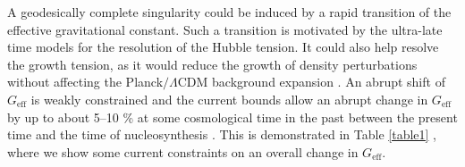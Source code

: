 \documentclass[universe,article,accept,moreauthors,pdftex]{Definitions/mdpi}
\begin{document}
A geodesically complete singularity could be induced by a rapid transition of the effective gravitational constant. Such a transition is motivated by the ultra-late time models for the resolution of
the Hubble tension.  It could also help resolve the growth tension, as it would reduce the growth
of density perturbations without affecting the Planck$/\Lambda$CDM background expansion \cite{Marra:2021fvf,Alestas:2021nmi,Perivolaropoulos:2022txg}. An abrupt shift of
$G_{\text{eff}}$ is weakly constrained and the current bounds allow
an abrupt change in $G_{\text{eff}}$ by up to about 5--10 \% at
some cosmological time in the past between the present
time and the time of nucleosynthesis \cite{Perivolaropoulos:2022txg}. This is demonstrated in Table \ref{table1} \cite{Alestas:2021nmi}, where we show some current constraints on an overall change in $G_{\text{eff}}$. 
\end{document}
